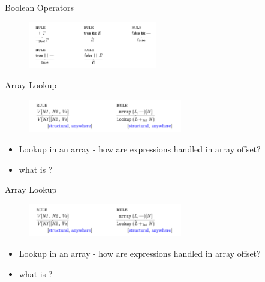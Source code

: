 \documentclass{beamer}
\begin{document}
\begin{frame}{Boolean Operators}
    \begin{figure}
        \centering
    \includegraphics[width=0.5\textwidth]{bool-1}
    \end{figure}
\end{frame}
\begin{frame}{Array Lookup}
    \begin{figure}
        \centering
    \includegraphics[width=0.6\textwidth]{array-lookup}
    \end{figure}

    \pause
    \begin{itemize}
        \item Lookup in an array - how are
            expressions handled in array offset?
        \pause
        \item what is ?
        \pause
    \end{itemize}
\end{frame}

\begin{frame}{Array Lookup}
    \begin{figure}
        \centering
    \includegraphics[width=0.6\textwidth]{array-lookup}
    \end{figure}

    \pause
    \begin{itemize}
        \item Lookup in an array - how are
            expressions handled in array offset?
        \pause
        \item what is ?
    \end{itemize}
\end{frame}
\end{document}
